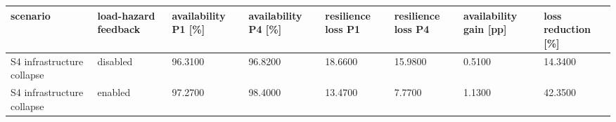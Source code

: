 \begin{tabular}{llllllll}
\toprule
scenario & load-hazard feedback & availability P1 [\%] & availability P4 [\%] & resilience loss P1 & resilience loss P4 & availability gain [pp] & loss reduction [\%] \\
\midrule
S4 infrastructure collapse & disabled & 96.3100 & 96.8200 & 18.6600 & 15.9800 & 0.5100 & 14.3400 \\
S4 infrastructure collapse & enabled & 97.2700 & 98.4000 & 13.4700 & 7.7700 & 1.1300 & 42.3500 \\
\bottomrule
\end{tabular}

